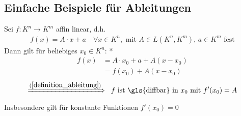 \subsection{Einfache Beispiele für Ableitungen}
\begin{example}
	Sei $f:K^n\to K^m$ affin linear, d.h. \begin{align*}
		f(x) = A\cdot x + a\quad \forall x\in K^n, \text{ mit } A\in L(K^n, K^m), \, a\in K^m \text{ fest}
	\end{align*}
	Dann gilt für beliebiges $x_0\in K^n$:
	\zeroAmsmathAlignVSpaces**
	\begin{align*}
		f(x) &= A\cdot x_0 + a + A(x - x_0) \\
		&=f(x_0) + A(x - x_0)
	\end{align*}
	\zeroAmsmathAlignVSpaces
	\begin{align*}
		\xRightarrow{(\ref{definition_ableitung})}\;\; \text{$f$ ist  \gls{diffbar} in $x_0$ mit } f'(x_0) = A
	\end{align*}
	Insbesondere gilt für konstante Funktionen $f'(x_0) = 0$
	\begin{center}\end{center}
\end{example}
